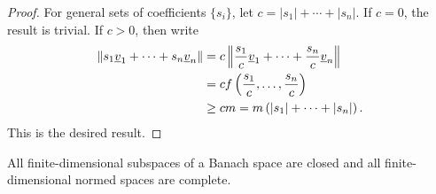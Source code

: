 \begin{proof}
For general sets of coefficients $\{ s_i \}$, let $c = |s_1| + \cdots + |s_n|$.
If $c = 0$, the result is trivial.
If $c > 0$, then write
\begin{equation*}
\begin{split}
\left\| s_1 \underline{v}_1 + \cdots + s_n \underline{v}_n \right\|
&= c \left\| \frac{s_1}{c} \underline{v}_1 + \cdots + \frac{s_n}{c} \underline{v}_n \right\| \\
&= c f \left( \frac{s_1}{c}, \ldots, \frac{s_n}{c} \right) \\
&\geq c m = m \left( |s_1| + \cdots + |s_n| \right) .
\end{split}
\end{equation*}
This is the desired result.
\end{proof}
\fi

\begin{theorem}
All finite-dimensional subspaces of a Banach space are closed and all finite-dimensional normed spaces are complete.
\end{theorem}
